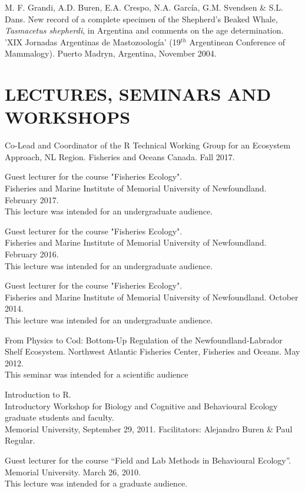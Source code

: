 \documentclass{res}
\begin{document}
\begin{resume}
\begin{hangparas}{.4in}{1}
M. F. Grandi, A.D. Buren, E.A. Crespo, N.A. García, G.M. Svendsen \& S.L. Dans. New record of a complete specimen of the Shepherd’s Beaked Whale, \textit{Tasmacetus shepherdi}, in Argentina and comments on the age determination. 'XIX Jornadas Argentinas de Mastozoolog\'{i}a' (19$^{th}$ Argentinean Conference of Mammalogy). Puerto Madryn, Argentina, November 2004.
	
	
\end{hangparas}	

\section{LECTURES, SEMINARS AND WORKSHOPS}
\vspace{0.1in} 

Co-Lead and Coordinator of the R Technical Working Group for an Ecosystem Approach, NL Region. Fisheries and Oceans Canada. Fall 2017.

Guest lecturer for the course "Fisheries Ecology".\\ Fisheries and Marine Institute of Memorial University of Newfoundland. February 2017. \\
This lecture was intended for an undergraduate audience.

Guest lecturer for the course "Fisheries Ecology". \\Fisheries and Marine Institute of Memorial University of Newfoundland. February 2016. \\
This lecture was intended for an undergraduate audience.

Guest lecturer for the course "Fisheries Ecology". \\Fisheries and Marine Institute of Memorial University of Newfoundland. October 2014. \\
This lecture was intended for an undergraduate audience.

From Physics to Cod: Bottom-Up Regulation of the Newfoundland-Labrador Shelf Ecosystem. Northwest Atlantic Fisheries Center, Fisheries and Oceans. May 2012. \\
This seminar was intended for a scientific audience 

Introduction to R.\\ Introductory Workshop for Biology and Cognitive and Behavioural Ecology graduate students and faculty.\\ Memorial University, September 29, 2011. Facilitators: Alejandro Buren \& Paul Regular.

Guest lecturer for the course “Field and Lab Methods in Behavioural Ecology”.\\ Memorial University. March 26, 2010. \\
This lecture was intended for a graduate audience.


\end{resume}
\end{document}

